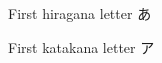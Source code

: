 \begin{itemize}
        \begin{center} First hiragana letter \Large {あ} {} \end{center}
        \begin{center} First katakana letter \Large {ア} {} \end{center}

%
%
%
%
%
%

\end{itemize}
